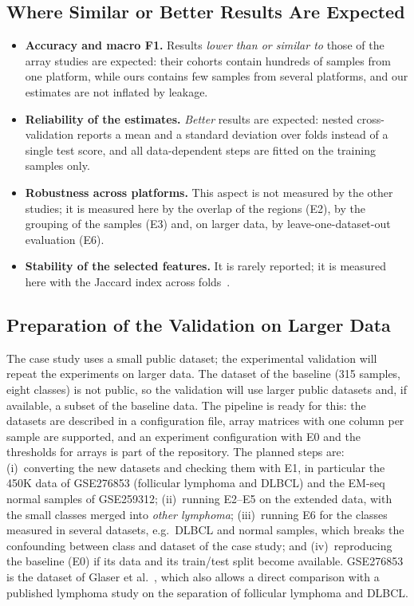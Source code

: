 \documentclass[runningheads]{llncs}
\begin{document}
\subsection{Where Similar or Better Results Are Expected}
\begin{itemize}
\item \textbf{Accuracy and macro F1.} Results \emph{lower than or similar to} those of the array studies are expected: their cohorts contain hundreds of samples from one platform, while ours contains few samples from several platforms, and our estimates are not inflated by leakage.
\item \textbf{Reliability of the estimates.} \emph{Better} results are expected: nested cross-validation reports a mean and a standard deviation over folds instead of a single test score, and all data-dependent steps are fitted on the training samples only.
\item \textbf{Robustness across platforms.} This aspect is not measured by the other studies; it is measured here by the overlap of the regions (E2), by the grouping of the samples (E3) and, on larger data, by leave-one-dataset-out evaluation (E6).
\item \textbf{Stability of the selected features.} It is rarely reported; it is measured here with the Jaccard index across folds~\cite{nogueira2018}.
\end{itemize}

\subsection{Preparation of the Validation on Larger Data}\label{sec:validation}

The case study uses a small public dataset; the experimental validation will repeat the experiments on larger data. The dataset of the baseline (315 samples, eight classes) is not public, so the validation will use larger public datasets and, if available, a subset of the baseline data. The pipeline is ready for this: the datasets are described in a configuration file, array matrices with one column per sample are supported, and an experiment configuration with E0 and the thresholds for arrays is part of the repository. The planned steps are: (i)~converting the new datasets and checking them with E1, in particular the 450K data of GSE276853 (follicular lymphoma and DLBCL) and the EM-seq normal samples of GSE259312; (ii)~running E2--E5 on the extended data, with the small classes merged into \emph{other lymphoma}; (iii)~running E6 for the classes measured in several datasets, e.g.\ DLBCL and normal samples, which breaks the confounding between class and dataset of the case study; and (iv)~reproducing the baseline (E0) if its data and its train/test split become available. GSE276853 is the dataset of Glaser et al.~\cite{glaser2025}, which also allows a direct comparison with a published lymphoma study on the separation of follicular lymphoma and DLBCL.
\end{document}
